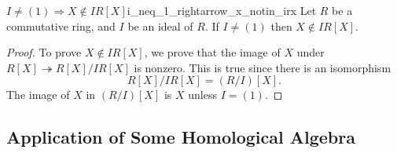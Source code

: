 \documentclass{article}
\begin{document}
\begin{lemma}{$I\neq(1)\Rightarrow X\notin IR[X]$}{i_neq_1_rightarrow_x_notin_irx}
    Let $R$ be a commutative ring, and $I$ be an ideal of $R$.
    If $I\neq (1)$ then $X\notin IR[X]$.
\end{lemma}
\begin{proof}
    To prove $X\notin IR[X]$, we prove that the image of $X$ under $R[X] \twoheadrightarrow R[X]/IR[X]$ is nonzero.
    This is true since there is an isomorphism
    \[ R[X]/IR[X] = (R/I)[X]. \]
    The image of $X$ in $(R/I)[X]$ is $X$ unless $I=(1)$.
\end{proof}

\subsection*{Application of Some Homological Algebra}
\end{document}
